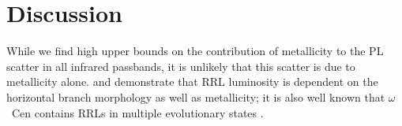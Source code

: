 \documentclass[a4paper,fleqn,usenatbib]{mnras}
\begin{document}

\section{Discussion}
\label{sec:discussion}

While we find high upper bounds on the contribution of metallicity to the PL scatter in all infrared passbands, it is unlikely that this scatter is due to metallicity alone. \citet{1986A&A...169..111G} and \citet{1991ApJ...373L..43L} demonstrate that RRL luminosity is dependent on the horizontal branch morphology as well as metallicity; it is also well known that $\omega$~Cen contains RRLs in multiple evolutionary states \citep{2008MmSAI..79..342S, 2015A&A...577A..99N}.
\end{document}
